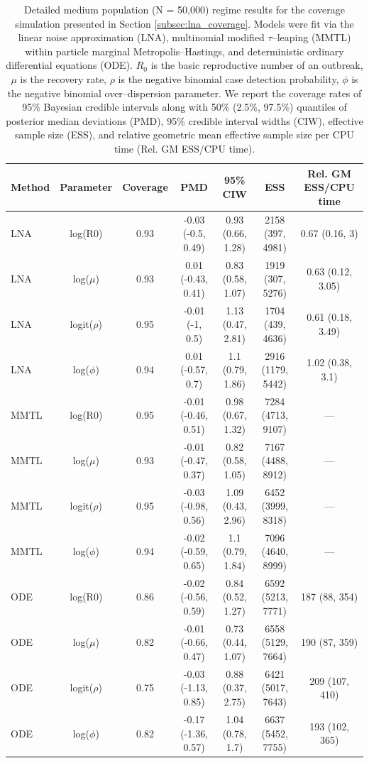\begin{table}
	\begin{fullpage}
		\small
		\centering
		\begin{tabular}{lcccccc}
			\hline
			Method & Parameter & Coverage & PMD & 95\% CIW & ESS & Rel. GM ESS/CPU time \\ 
			\hline
			LNA & log(R0) & 0.93 & -0.03 (-0.5, 0.49) & 0.93 (0.66, 1.28) & 2158 (397, 4981) & 0.67 (0.16, 3) \\ 
			LNA & log($\mu$) & 0.93 & 0.01 (-0.43, 0.41) & 0.83 (0.58, 1.07) & 1919 (307, 5276) & 0.63 (0.12, 3.05) \\ 
			LNA & logit($\rho$) & 0.95 & -0.01 (-1, 0.5) & 1.13 (0.47, 2.81) & 1704 (439, 4636) & 0.61 (0.18, 3.49) \\ 
			LNA & log($\phi$) & 0.94 & 0.01 (-0.57, 0.7) & 1.1 (0.79, 1.86) & 2916 (1179, 5442) & 1.02 (0.38, 3.1) \\ 
			MMTL & log(R0) & 0.95 & -0.01 (-0.46, 0.51) & 0.98 (0.67, 1.32) & 7284 (4713, 9107) & --- \\ 
			MMTL & log($\mu$) & 0.93 & -0.01 (-0.47, 0.37) & 0.82 (0.58, 1.05) & 7167 (4488, 8912) & --- \\ 
			MMTL & logit($\rho$) & 0.95 & -0.03 (-0.98, 0.56) & 1.09 (0.43, 2.96) & 6452 (3999, 8318) & --- \\ 
			MMTL & log($\phi$) & 0.94 & -0.02 (-0.59, 0.65) & 1.1 (0.79, 1.84) & 7096 (4640, 8999) & --- \\ 
			ODE & log(R0) & 0.86 & -0.02 (-0.56, 0.59) & 0.84 (0.52, 1.27) & 6592 (5213, 7771) & 187 (88, 354) \\ 
			ODE & log($\mu$) & 0.82 & -0.01 (-0.66, 0.47) & 0.73 (0.44, 1.07) & 6558 (5129, 7664) & 190 (87, 359) \\ 
			ODE & logit($\rho$) & 0.75 & -0.03 (-1.13, 0.85) & 0.88 (0.37, 2.75) & 6421 (5017, 7643) & 209 (107, 410) \\ 
			ODE & log($\phi$) & 0.82 & -0.17 (-1.36, 0.57) & 1.04 (0.78, 1.7) & 6637 (5452, 7755) & 193 (102, 365) \\ 
			\hline
		\end{tabular}
		\caption[Medium population coverage results for SIR models fit via the LNA, ODE, and MMTL approximations.]{Detailed medium population (N = 50,000) regime results for the coverage simulation presented in Section \ref{subsec:lna_coverage}. Models were fit via the linear noise approximation (LNA), multinomial modified $ \tau $--leaping (MMTL) within particle marginal Metropolis--Hastings, and deterministic ordinary differential equations (ODE). $ R_0 $ is the basic reproductive number of an outbreak, $ \mu $ is the recovery rate, $ \rho $ is the negative binomial case detection probability, $ \phi $ is the negative binomial over--dispersion parameter. We report the coverage rates of 95\% Bayesian credible intervals along with 50\% (2.5\%, 97.5\%) quantiles of posterior median deviations (PMD), 95\% credible interval widths (CIW), effective sample size (ESS), and relative geometric mean effective sample size per CPU time (Rel. GM ESS/CPU time).}
	\end{fullpage}
\end{table}	

